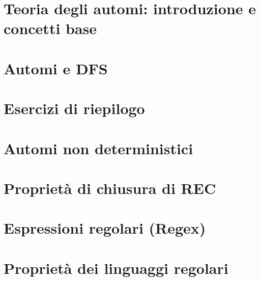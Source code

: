 \documentclass[12pt]{article}
\begin{document}


\tableofcontents
\restoregeometry

\section{Teoria degli automi: introduzione e concetti base}


\section{Automi e DFS}


\section{Esercizi di riepilogo}


\section{Automi non deterministici}


\section{Proprietà di chiusura di REC}


\section{Espressioni regolari (Regex)}


\section{Proprietà dei linguaggi regolari}

\end{document}
